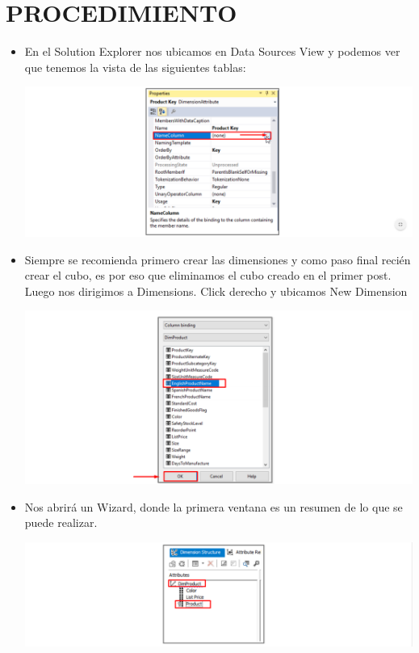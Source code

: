 \section{PROCEDIMIENTO} 

\begin{itemize}
\subsection{Creación de una Dimensión Regular}
	 \item  En el Solution Explorer nos ubicamos en Data Sources View y podemos ver que tenemos la vista de las
siguientes tablas:
	\begin{center}
	\includegraphics[width=\columnwidth]{./Imagenes/img1}
	\end{center}	


 \item Siempre se recomienda primero crear las dimensiones y como paso final recién crear el cubo, es por eso que
eliminamos el cubo creado en el primer post. Luego nos dirigimos a Dimensions. Click derecho y ubicamos
New Dimension
	\begin{center}
	\includegraphics[width=\columnwidth]{./Imagenes/img2}
	\end{center}	

 \item Nos abrirá un Wizard, donde la primera ventana es un resumen de lo que se puede realizar.
	\begin{center}
	\includegraphics[width=\columnwidth]{./Imagenes/img3}
	\end{center}	


\end{itemize}
